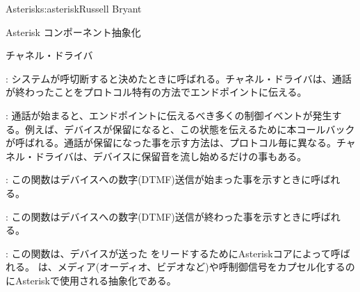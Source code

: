 \begin{aosachapter}{Asterisk}{s:asterisk}{Russell Bryant}
\begin{aosasect1}{Asterisk コンポーネント抽象化}
\begin{aosasect2}{チャネル・ドライバ}
\begin{aosaitemize}
\item {}: システムが呼切断すると決めたときに呼ばれる。チャネル・ドライバは、通話が終わったことをプロトコル特有の方法でエンドポイントに伝える。

\item {}: 通話が始まると、エンドポイントに伝えるべき多くの制御イベントが発生する。例えば、デバイスが保留になると、この状態を伝えるために本コールバックが呼ばれる。通話が保留になった事を示す方法は、プロトコル毎に異なる。チャネル・ドライバは、デバイスに保留音を流し始めるだけの事もある。

\item {}: この関数はデバイスへの数字(DTMF)送信が始まった事を示すときに呼ばれる。

\item {}: この関数はデバイスへの数字(DTMF)送信が終わった事を示すときに呼ばれる。

\item {}: この関数は、デバイスが送った をリードするためにAsteriskコアによって呼ばれる。 は、メディア(オーディオ、ビデオなど)や呼制御信号をカプセル化するのにAsteriskで使用される抽象化である。


\end{aosaitemize}
\end{aosasect2}
\end{aosasect1}
\end{aosachapter}
